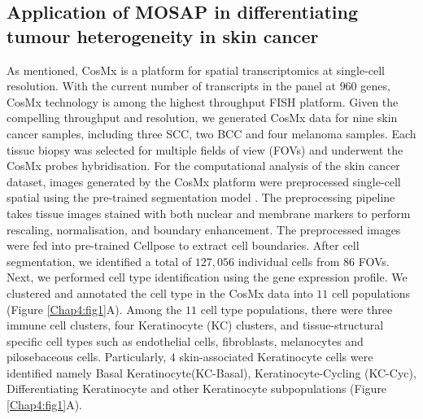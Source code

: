 \subsection{Application of MOSAP in differentiating tumour heterogeneity in skin cancer}
As mentioned, CosMx is a platform for spatial transcriptomics at single-cell resolution. With the current number of transcripts in the panel at $960$ genes, CosMx technology is among the highest throughput FISH platform. Given the compelling throughput and resolution, we generated CosMx data for nine skin cancer samples, including three SCC, two BCC and four melanoma samples. Each tissue biopsy was selected for multiple fields of view (FOVs) and underwent the CosMx probes hybridisation. For the computational analysis of the skin cancer dataset, images generated by the CosMx platform were preprocessed single-cell spatial using the pre-trained segmentation model \cite{stringer2021cellpose}. The preprocessing pipeline takes tissue images stained with both nuclear and membrane markers to perform rescaling, normalisation, and boundary enhancement. The preprocessed images were fed into pre-trained Cellpose \cite{stringer2021cellpose} to extract cell boundaries. After cell segmentation, we identified a total of $127,056$ individual cells from $86$ FOVs. Next, we performed cell type identification using the gene expression profile. We clustered and annotated the cell type in the CosMx data into $11$ cell populations (Figure \ref{Chap4:fig1}A). Among the $11$ cell type populations, there were three immune cell clusters, four Keratinocyte (KC) clusters, and tissue-structural specific cell types such as endothelial cells, fibroblasts, melanocytes and pilosebaceous cells. Particularly, $4$ skin-associated Keratinocyte cells were identified namely Basal Keratinocyte(KC-Basal), Keratinocyte-Cycling (KC-Cyc), Differentiating Keratinocyte and other Keratinocyte subpopulations (Figure \ref{Chap4:fig1}A). 

